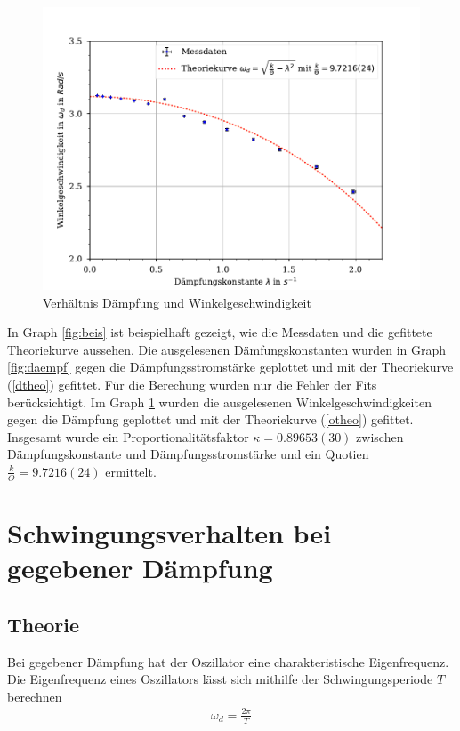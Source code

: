 \documentclass[11pt, a4paper]{article}
\begin{document}
    \begin{figure}
        \centering
        \includegraphics[width=\textwidth]{./7Plot.pdf}

        \caption{Verhältnis Dämpfung und Winkelgeschwindigkeit}
        \label{fig:wink}
    \end{figure}

    In Graph \ref{fig:beis} ist beispielhaft gezeigt, wie die Messdaten und die gefittete Theoriekurve aussehen.
    Die ausgelesenen Dämfungskonstanten wurden in Graph \ref{fig:daempf} gegen die Dämpfungsstromstärke geplottet und mit der
    Theoriekurve (\ref{dtheo}) gefittet. Für die Berechung wurden nur die Fehler der Fits berücksichtigt.
    Im Graph \ref{fig:wink} wurden die ausgelesenen Winkelgeschwindigkeiten gegen die Dämpfung geplottet und mit der Theoriekurve
    (\ref{otheo}) gefittet. Insgesamt wurde ein Proportionalitätsfaktor $\kappa  = 0.89653(30)$ zwischen Dämpfungskonstante und
    Dämpfungsstromstärke und ein Quotien $ \frac{k}{\Theta} = 9.7216(24)$ ermittelt.
   
    \section{Schwingungsverhalten bei gegebener Dämpfung}
    \subsection{Theorie}

    Bei gegebener Dämpfung hat der Oszillator eine charakteristische Eigenfrequenz.
    Die Eigenfrequenz eines Oszillators lässt sich mithilfe der Schwingungsperiode $T$ berechnen
    \begin{align}
        \omega_d = \frac{2\pi}{T}
    \end{align}
\end{document}
